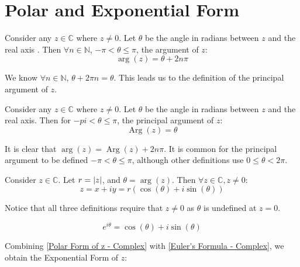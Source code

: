 \documentclass[12pt, english]{book}
\begin{document}
	\section{Polar and Exponential Form} \label{Polar and Exponential Form Section - Complex}
	
	\begin{definition}
		Consider any $z \in \mathbb{C}$ where $z \neq 0$.
		Let $\theta$ be the angle in radians between $z$ and the real axis .
		Then $\forall n \in \mathbb{N}$, $-\pi < \theta \leq \pi$, the argument of $z$:
		$$ \operatorname{arg}(z) = \theta + 2 n \pi$$
		\label{Argument - Complex}
	\end{definition}
	
	We know $\forall n \in \mathbb{N}$, $\theta + 2 \pi n = \theta$. This leads us to the definition of the principal argument of $z$.
	\begin{definition}
		Consider any $z \in \mathbb{C}$ where $z \neq 0$.
		Let $\theta$ be the angle in radians between $z$ and the real axis.
		Then for $-pi < \theta \leq \pi$, the principal argument of $z$:
		$$\operatorname{Arg}(z) = \theta$$
		\label{Principal Argument - Complex}
	\end{definition}
	It is clear that $\operatorname{arg}(z) = \operatorname{Arg}(z) + 2n \pi$. It is common for the principal argument to be defined $-\pi < \theta \leq \pi$, although other definitions use $0 \leq \theta < 2\pi$.
	
	\begin{definition}
		Consider $z \in \mathbb{C}$. Let $r = \abs{z}$, and $\theta = \operatorname{arg}(z)$. 
		Then $\forall z \in \mathbb{C}, z \neq 0$:
		$$z = x + iy = r(\cos(\theta) + i \sin(\theta))$$
		\label{Polar Form of z - Complex}
	\end{definition}

	Notice that all three definitions require that $z \neq 0$ as $\theta$ is undefined at $z = 0$.
	
	\begin{theorem}
		$$e^{i \theta} = \cos(\theta) + i \sin(\theta)$$
		\label{Euler's Formula - Complex}
	\end{theorem}
	Combining \cref{Polar Form of z - Complex} with \cref{Euler's Formula - Complex}, we obtain the Exponential Form of $z$: 
	
\end{document}
